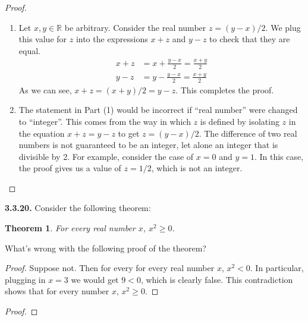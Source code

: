 \documentclass[12pt]{amsart}
\newenvironment{statement}[1]{\smallskip\noindent\color[rgb]{.6627, .3529, .6314} {\bf #1.}}{}
\newtheorem{theorem}{Theorem}
\theoremstyle{definition}
\theoremstyle{remark}
\newcommand{\BR}{\mathbb R}
\begin{document}
\begin{proof}
\hfill
\begin{enumerate}
	\item Let $x, y \in \BR$ be arbitrary. 
	Consider the real number $z = (y - x) / 2$.
	We plug this value for $z$ into the expressions $x + z$ and $y - z$ to check that they are equal.
	\begin{align*}
		x + z &= x + \frac{y - x}{2} = \frac{x + y}{2} \\
		y - z &= y - \frac{y - x}{2} = \frac{x + y}{2}
	\end{align*}
	As we can see, $x + z = (x + y) / 2 = y - z$.
	This completes the proof.
	
	\item The statement in Part (1) would be incorrect if ``real number'' were changed to ``integer''.
	This comes from the way in which $z$ is defined by 
	isolating $z$ in the equation $x + z = y - z$ to get $z = (y - x) / 2$.
	The difference of two real numbers is not guaranteed to be an integer,
	let alone an integer that is divisible by 2.
	For example, consider the case of $x = 0$ and $y = 1$.
	In this case, the proof gives us a value of $z = 1/2$, which is not an integer.
\end{enumerate}
\end{proof}


\begin{statement}{3.3.20}
Consider the following theorem:
\begin{theorem}
	For every real number $x$, $x^2 \geq 0$.
\end{theorem}
What's wrong with the following proof of the theorem?
\begin{proof}
	Suppose not.
	Then for every for every real number $x$, $x^2 < 0$.
	In particular, plugging in $x = 3$ we would get $9 < 0$, which is clearly false.
	This contradiction shows that for every number $x$, $x^2 \geq 0$.
\end{proof}
\end{statement}

\begin{proof}
\end{proof}
\end{document}
